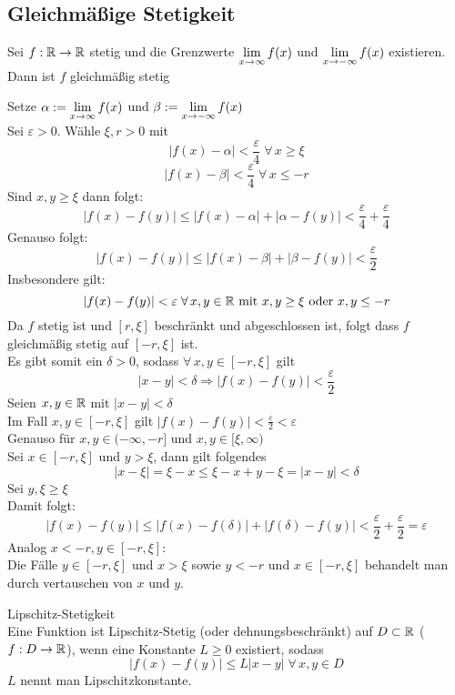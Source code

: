 \documentclass[../ana1u.tex]{subfiles}
\begin{document}
\subsection{Gleichmäßige Stetigkeit}
\begin{beh}
    Sei \(f:\mathbb{R} \rightarrow \mathbb{R} \) stetig und die Grenzwerte \(\lim\limits_{x\rightarrow\infty} f(x)\) und 
    \(\lim\limits_{x\rightarrow -\infty} f(x) \) existieren. \\
    Dann ist \(f\) gleichmäßig stetig
\end{beh}
\begin{bew}
    Setze \(\alpha := \lim\limits_{x\rightarrow\infty} f(x) \) und \(\beta := \lim\limits_{x\rightarrow -\infty} f(x) \) \\
    Sei \(\varepsilon > 0 \). Wähle \(\xi, r > 0 \) mit
    \[|f(x) - \alpha| < \frac{\varepsilon}{4} \; \forall \, x \geq \xi \]
    \[|f(x) - \beta| < \frac{\varepsilon}{4} \; \forall \, x \leq -r \]
    Sind \(x,y \geq \xi \) dann folgt:
    \[|f(x)-f(y)| \leq |f(x) - \alpha| + |\alpha - f(y)| < \frac{\varepsilon}{4} + \frac{\varepsilon}{4} \]
    Genauso folgt:
    \[|f(x)-f(y)| \leq |f(x)-\beta| + |\beta-f(y)| < \frac{\varepsilon}{2} \]
    Insbesondere gilt:
    \[|f(x)-f(y)| < \varepsilon \; \forall \, x,y \in \mathbb{R} \text{ mit } x,y \geq \xi \text{ oder } x,y \leq -r \]
    Da \(f\) stetig ist und \([r, \xi] \) beschränkt und abgeschlossen ist, folgt dass \(f\) gleichmäßig
    stetig auf \([-r,\xi] \) ist. \\
    Es gibt somit ein \(\delta > 0 \), sodass \(\forall \, x,y \in [-r, \xi] \) gilt
    \[|x-y| < \delta \Rightarrow |f(x)-f(y)| < \frac{\varepsilon}{2} \]
    Seien \(x,y \in \mathbb{R} \) mit \(|x-y| < \delta \) \\
    Im Fall \(x,y \in [-r, \xi] \) gilt \(|f(x)-f(y)| < \frac{\varepsilon}{2} < \varepsilon \) \\
    Genauso für \(x,y \in (-\infty, -r] \) und \(x,y \in [\xi, \infty) \) \\
    Sei \(x \in [-r, \xi] \) und \(y > \xi \), dann gilt folgendes 
    \[|x-\xi| = \xi - x \leq \xi - x+y - \xi = |x-y| < \delta \]
    Sei \(y, \xi \geq \xi \) \\
    Damit folgt:
    \[|f(x)-f(y)| \leq |f(x)-f(\delta)| + |f(\delta)-f(y)| < \frac{\varepsilon}{2} + \frac{\varepsilon}{2}
    = \varepsilon \]
    Analog \(x < -r, y \in [-r,\xi] \): \\
    Die Fälle \(y \in [-r, \xi] \) und \(x > \xi \) sowie \(y < -r \) und \(x \in [-r, \xi] \) behandelt
    man durch vertauschen von \(x \) und \(y \).
\end{bew}
\begin{defi*}
    Lipschitz-Stetigkeit \\
    Eine Funktion ist Lipschitz-Stetig (oder dehnungsbeschränkt) auf \(D \subset \mathbb{R} \) (\(f:D \rightarrow \mathbb{R} \)),
    wenn eine Konstante \(L \geq 0 \) existiert, sodass
    \[|f(x)-f(y)| \leq L|x-y| \; \forall \, x,y \in D \]
    \(L \) nennt man Lipschitzkonstante.
\end{defi*}
\end{document}
